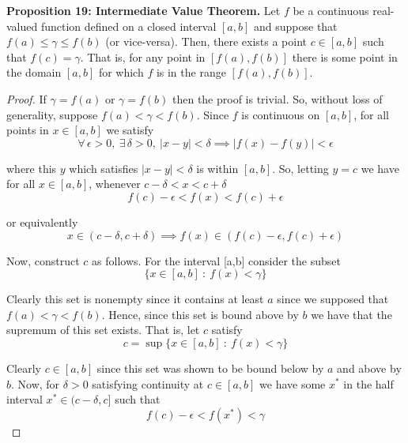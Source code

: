 \documentclass[12pt]{article}
\newlength\tindent
\renewcommand{\indent}{\hspace*{\tindent}}
\begin{document}
%
% 
{\bf Proposition 19: Intermediate Value Theorem.} Let $f$ be a continuous real-valued function defined on a closed interval $[a,b]$ and suppose that $f(a) \leq \gamma \leq f(b)$ (or vice-versa). Then, there exists a point $c \in [a,b]$ such that $f(c) = \gamma$. That is, for any point in $[f(a), f(b)]$ there is some point in the domain $[a,b]$ for which $f$ is in the range $[f(a), f(b)]$.

\begin{proof} If $\gamma = f(a)$ or $\gamma = f(b)$ then the proof is trivial. So, without loss of generality, suppose $f(a) < \gamma < f(b)$. Since $f$ is continuous on $[a,b]$, for all points in $x \in [a,b]$ we satisfy
\begin{equation*}
	\forall\,\epsilon > 0,~\exists\,\delta > 0,~|x - y| < \delta \implies |f(x) - f(y)| < \epsilon
\end{equation*}

where this $y$ which satisfies $|x - y| < \delta$ is within $[a,b]$. So, letting $y = c$ we have for all $x \in [a,b]$, whenever $c - \delta < x < c + \delta$
\begin{equation*}
	f(c) - \epsilon < f(x) < f(c) + \epsilon
\end{equation*}

or equivalently
\begin{equation*}
	x \in (c - \delta, c + \delta) \implies f(x) \in (f(c) - \epsilon, f(c) + \epsilon)
\end{equation*}

Now, construct $c$ as follows. For the interval [a,b] consider the subset
\begin{equation*}
	\{x \in [a,b] ~:~ f(x) < \gamma\}
\end{equation*}

\indent Clearly this set is nonempty since it contains at least $a$ since we supposed that $f(a) < \gamma < f(b)$. Hence, since this set is bound above by $b$ we have that the supremum of this set exists. That is, let $c$ satisfy
\begin{equation*}
	c = \sup \{x \in [a,b] ~:~ f(x) < \gamma\}
\end{equation*}

\indent Clearly $c \in [a,b]$ since this set was shown to be bound below by $a$ and above by $b$. Now, for $\delta > 0$ satisfying continuity at $c \in [a,b]$ we have some $x^*$ in the half interval $x^* \in (c - \delta, c]$ such that
\begin{equation*}
	f(c) - \epsilon < f(x^*) < \gamma
\end{equation*}


\end{proof}
\end{document}
